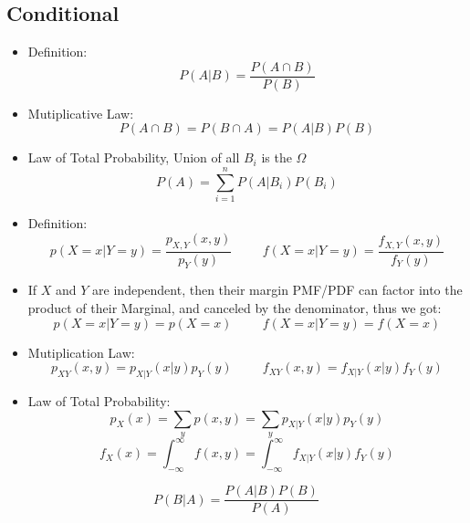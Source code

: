 \documentclass[12pt]{article}
\begin{document}
\begin{multicols*}{4}
    \section{Conditional}
    \begin{tcolorbox}[title=Conditional Probability for Event]
        \begin{itemize}[leftmargin=*]
            \item Definition:
                  $$P(A|B)=\frac{P(A\cap B)}{P(B)}$$
            \item Mutiplicative Law:
                  $$P(A\cap B)=P(B\cap A)=P(A|B)P(B)$$
            \item Law of Total Probability, Union of all $B_i$ is the $\Omega$
                  $$P(A)=\sum_{i=1}^nP(A|B_i)P(B_i)$$
        \end{itemize}
    \end{tcolorbox}
    \begin{tcolorbox}[title=Conditional Probability for Multivariate]
        \begin{itemize}[leftmargin=*]
            \item Definition:
                  $$p(X=x|Y=y)=\frac{p_{X, Y}(x, y)}{p_Y(y)}\hspace{1cm}f(X=x|Y=y)=\frac{f_{X, Y}(x, y)}{f_Y(y)}$$
            \item If $X$ and $Y$ are independent, then their margin PMF/PDF can factor into the product of their Marginal, and canceled by the denominator, thus we got:
                  $$p(X=x|Y=y)=p(X=x)\hspace{1cm}f(X=x|Y=y)=f(X=x)$$
            \item Mutiplication Law:
                  $$p_{XY}(x, y)=p_{X|Y}(x|y)p_Y(y)\hspace{1cm}f_{XY}(x, y)=f_{X|Y}(x|y)f_Y(y)$$
            \item Law of Total Probability:
                  $$p_X(x)=\sum_yp(x, y)=\sum_yp_{X|Y}(x|y)p_Y(y)$$
                  $$f_X(x)=\int_{-\infty}^\infty f(x, y)=\int_{-\infty}^\infty f_{X|Y}(x|y)f_Y(y)$$
        \end{itemize}
    \end{tcolorbox}
    \begin{tcolorbox}[title=Bayes's Rule]
        $$P(B|A)=\frac{P(A|B)P(B)}{P(A)}$$
    \end{tcolorbox}

\end{multicols*}
\end{document}
